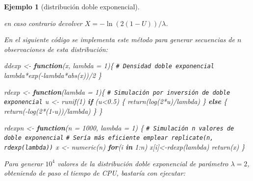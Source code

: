 \documentclass[
  10pt,
]{book}
\newenvironment{Shaded}{\begin{snugshade}}{\end{snugshade}}
\newcommand{\AttributeTok}[1]{\textcolor[rgb]{0.77,0.63,0.00}{#1}}
\newcommand{\CommentTok}[1]{\textcolor[rgb]{0.56,0.35,0.01}{\textit{#1}}}
\newcommand{\ControlFlowTok}[1]{\textcolor[rgb]{0.13,0.29,0.53}{\textbf{#1}}}
\newcommand{\DecValTok}[1]{\textcolor[rgb]{0.00,0.00,0.81}{#1}}
\newcommand{\FloatTok}[1]{\textcolor[rgb]{0.00,0.00,0.81}{#1}}
\newcommand{\FunctionTok}[1]{\textcolor[rgb]{0.00,0.00,0.00}{#1}}
\newcommand{\NormalTok}[1]{#1}
\newcommand{\OtherTok}[1]{\textcolor[rgb]{0.56,0.35,0.01}{#1}}
\newcommand{\SpecialCharTok}[1]{\textcolor[rgb]{0.00,0.00,0.00}{#1}}
\theoremstyle{break}
\newtheorem{example}{Ejemplo}[chapter]
\theoremstyle{nonumberplain}
\renewcommand{\CommentTok}[1]{\textcolor[rgb]{0.41,0.41,0.41}{\texttt{#1}}}
\begin{document}
\begin{example}[distribución doble exponencial]
\begin{enumerate}
  en caso contrario devolver \(X = - \ln \left( 2(1-U) \right)/\lambda\).
\end{enumerate}

En el siguiente código se implementa este método para generar secuencias de \(n\) observaciones de esta distribución:

\begin{Shaded}
\begin{Highlighting}[]
\NormalTok{ddexp }\OtherTok{\textless{}{-}} \ControlFlowTok{function}\NormalTok{(x, }\AttributeTok{lambda =} \DecValTok{1}\NormalTok{)\{}
\CommentTok{\# Densidad doble exponencial}
\NormalTok{  lambda}\SpecialCharTok{*}\FunctionTok{exp}\NormalTok{(}\SpecialCharTok{{-}}\NormalTok{lambda}\SpecialCharTok{*}\FunctionTok{abs}\NormalTok{(x))}\SpecialCharTok{/}\DecValTok{2}
\NormalTok{\}}

\NormalTok{rdexp }\OtherTok{\textless{}{-}} \ControlFlowTok{function}\NormalTok{(}\AttributeTok{lambda =} \DecValTok{1}\NormalTok{)\{}
\CommentTok{\# Simulación por inversión de doble exponencial}
\NormalTok{  u }\OtherTok{\textless{}{-}} \FunctionTok{runif}\NormalTok{(}\DecValTok{1}\NormalTok{)}
  \ControlFlowTok{if}\NormalTok{ (u}\SpecialCharTok{\textless{}}\FloatTok{0.5}\NormalTok{) \{}
    \FunctionTok{return}\NormalTok{(}\FunctionTok{log}\NormalTok{(}\DecValTok{2}\SpecialCharTok{*}\NormalTok{u)}\SpecialCharTok{/}\NormalTok{lambda)}
\NormalTok{  \} }\ControlFlowTok{else}\NormalTok{ \{}
    \FunctionTok{return}\NormalTok{(}\SpecialCharTok{{-}}\FunctionTok{log}\NormalTok{(}\DecValTok{2}\SpecialCharTok{*}\NormalTok{(}\DecValTok{1}\SpecialCharTok{{-}}\NormalTok{u))}\SpecialCharTok{/}\NormalTok{lambda)}
\NormalTok{  \}}
\NormalTok{\}}

\NormalTok{rdexpn }\OtherTok{\textless{}{-}} \ControlFlowTok{function}\NormalTok{(}\AttributeTok{n =} \DecValTok{1000}\NormalTok{, }\AttributeTok{lambda =} \DecValTok{1}\NormalTok{) \{}
\CommentTok{\# Simulación n valores de doble exponencial}
\CommentTok{\# Sería más eficiente emplear replicate(n, rdexp(lambda))}
\NormalTok{  x }\OtherTok{\textless{}{-}} \FunctionTok{numeric}\NormalTok{(n)}
  \ControlFlowTok{for}\NormalTok{(i }\ControlFlowTok{in} \DecValTok{1}\SpecialCharTok{:}\NormalTok{n) x[i]}\OtherTok{\textless{}{-}}\FunctionTok{rdexp}\NormalTok{(lambda)}
  \FunctionTok{return}\NormalTok{(x)}
\NormalTok{\}}
\end{Highlighting}
\end{Shaded}

Para generar \(10^{4}\) valores de la distribución doble exponencial de parámetro \(\lambda=2\), obteniendo de paso el tiempo de CPU, bastaría con ejecutar:


\end{example}
\end{document}
